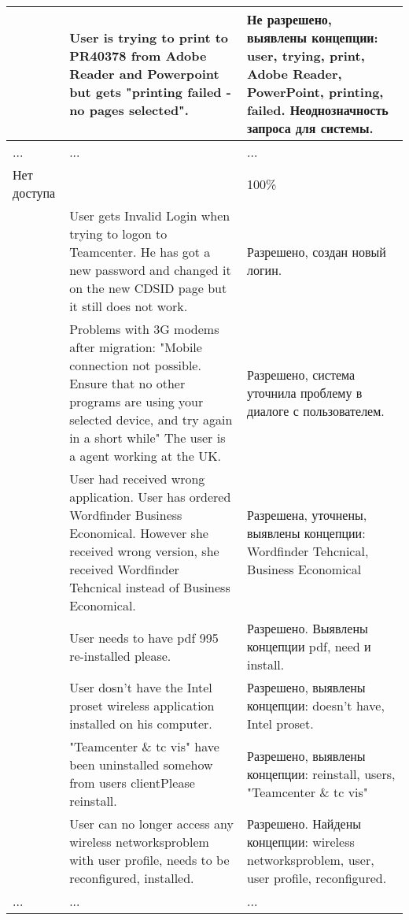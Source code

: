 \begin{longtable}{|p{5cm}|p{6cm}|p{5cm}|}
 \hline         &    User is trying to print to PR40378 from Adobe Reader and Powerpoint but gets "printing failed - no pages selected".   &  Не разрешено, выявлены концепции: user, trying, print, Adobe Reader, PowerPoint, printing, failed. Неоднозначность запроса для системы.  \\

 
\hline     ...    &   ...   & ... \\
  \hline Нет доступа         &       & 100\% \\
  
   \hline         &    User gets Invalid Login when trying to logon to Teamcenter. He has got a new password and changed it on the new CDSID page but it still does not work.    &  Разрешено, создан новый логин. \\

   \hline         &   Problems with 3G modems after migration: "Mobile connection not possible. Ensure that no other programs are using your selected device, and try again in a short while" The user is a agent working at the UK.    & Разрешено, система уточнила проблему в диалоге с пользователем. \\

   \hline         &    User had received wrong application. User has ordered Wordfinder Business Economical. However she received wrong version, she received Wordfinder Tehcnical instead of Business Economical.   &  Разрешена, уточнены, выявлены концепции: Wordfinder Tehcnical,  Business Economical  \\
  \hline         &    User needs to have pdf 995 re-installed please.    & Разрешено. Выявлены концепции pdf, need и install. \\
  \hline         &    User dosn't have the Intel proset wireless application installed on his computer.    & Разрешено, выявлены концепции: doesn't have,  Intel proset. \\
  \hline         &    "Teamcenter \& tc vis" have been uninstalled somehow from users clientPlease reinstall.    &  Разрешено, выявлены концепции: reinstall, users, "Teamcenter \& tc vis"\\
  \hline         &    User can no longer access any wireless networksproblem with user profile, needs to be reconfigured, installed.    & Разрешено. Найдены концепции:  wireless networksproblem, user, user profile, reconfigured.\\
\hline     ...    &   ...   & ... \\

 
  \hline
  \end{longtable}
  

